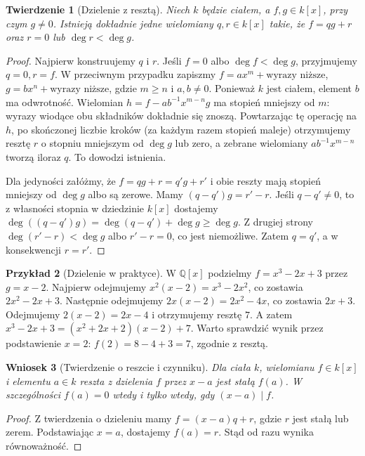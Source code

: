 \documentclass[11pt,a4paper,openany]{report}
\numberwithin{equation}{section}
\theoremstyle{plain}
\newtheorem{twierdzenie}{Twierdzenie}[section]
\newtheorem{wniosek}[twierdzenie]{Wniosek}
\theoremstyle{definition}
\newtheorem{przyklad}[twierdzenie]{Przykład}
\theoremstyle{remark}
\newcommand{\Q}{\mathbb Q}
\begin{document}
\begin{twierdzenie}[Dzielenie z resztą]
\label{tw:dzielenie}
Niech $k$ będzie ciałem, a $f,g\in k[x]$, przy czym $g\ne0$.
Istnieją dokładnie jedne wielomiany $q,r\in k[x]$ takie, że
$f=qg+r$ oraz $r=0$ lub $\deg r<\deg g$.
\end{twierdzenie}
\begin{proof}
Najpierw konstruujemy $q$ i $r$.
Jeśli $f=0$ albo $\deg f<\deg g$, przyjmujemy $q=0,r=f$.
W przeciwnym przypadku zapiszmy
$f=ax^m+\text{wyrazy niższe}$,
$g=bx^n+\text{wyrazy niższe}$, gdzie $m\ge n$ i $a,b\ne0$.
Ponieważ $k$ jest ciałem, element $b$ ma odwrotność.
Wielomian $h=f-ab^{-1}x^{m-n}g$ ma stopień mniejszy od $m$:
wyrazy wiodące obu składników dokładnie się znoszą.
Powtarzając tę operację na $h$, po skończonej liczbie kroków
(za każdym razem stopień maleje) otrzymujemy resztę $r$ o stopniu
mniejszym od $\deg g$ lub zero, a zebrane wielomiany
$ab^{-1}x^{m-n}$ tworzą iloraz $q$. To dowodzi istnienia.

Dla jedyności załóżmy, że $f=qg+r=q'g+r'$ i obie reszty
mają stopień mniejszy od $\deg g$ albo są zerowe.
Mamy $(q-q')g=r'-r$. Jeśli $q-q'\ne0$, to z własności stopnia
w dziedzinie $k[x]$ dostajemy
$\deg((q-q')g)=\deg(q-q')+\deg g\ge\deg g$.
Z drugiej strony $\deg(r'-r)<\deg g$ albo $r'-r=0$,
co jest niemożliwe. Zatem $q=q'$, a w konsekwencji $r=r'$.
\end{proof}

\begin{przyklad}[Dzielenie w praktyce]
W $\Q[x]$ podzielmy $f=x^3-2x+3$ przez $g=x-2$.
Najpierw odejmujemy $x^2(x-2)=x^3-2x^2$,
co zostawia $2x^2-2x+3$.
Następnie odejmujemy $2x(x-2)=2x^2-4x$,
co zostawia $2x+3$. Odejmujemy $2(x-2)=2x-4$
i otrzymujemy resztę $7$. A zatem
$x^3-2x+3=(x^2+2x+2)(x-2)+7$.
Warto sprawdzić wynik przez podstawienie $x=2$:
$f(2)=8-4+3=7$, zgodnie z resztą.
\end{przyklad}

\begin{wniosek}[Twierdzenie o reszcie i czynniku]
Dla ciała $k$, wielomianu $f\in k[x]$ i elementu $a\in k$
reszta z dzielenia $f$ przez $x-a$ jest stałą $f(a)$.
W szczególności $f(a)=0$ wtedy i tylko wtedy, gdy $(x-a)\mid f$.
\end{wniosek}
\begin{proof}
Z twierdzenia o dzieleniu mamy $f=(x-a)q+r$,
gdzie $r$ jest stałą lub zerem. Podstawiając $x=a$,
dostajemy $f(a)=r$. Stąd od razu wynika równoważność.
\end{proof}
\end{document}

